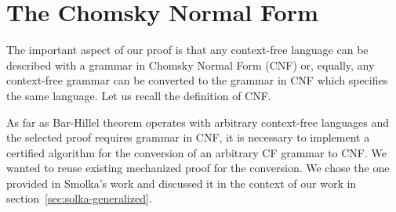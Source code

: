 \section{The Chomsky Normal Form}
\label{sec:cnf}

The important aspect of our proof is that any context-free language can be described with a grammar in Chomsky Normal Form (CNF) or, equally, any context-free grammar can be converted to the grammar in CNF which specifies the same language.
Let us recall the definition of CNF.%
{}


As far as Bar-Hillel theorem operates with arbitrary context-free languages and the selected proof requires grammar in CNF, it is necessary to implement a certified algorithm for the conversion of an arbitrary CF grammar to CNF.
We wanted to reuse existing mechanized proof for the conversion.
We chose the one provided in Smolka's work and discussed it in the context of our work in section~\ref{sec:solka-generalized}.



